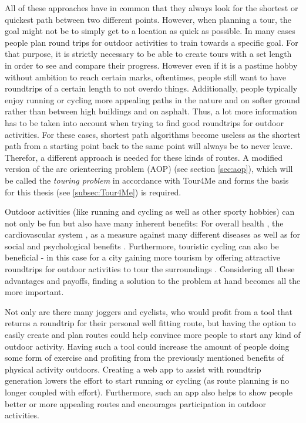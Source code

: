 All of these approaches have in common that they always look for the shortest or quickest path between two different points.
However, when planning a tour, the goal might not be to simply get to a location as quick as possible.
In many cases people plan round trips for outdoor activities  to train towards a specific goal.
For that purpose, it is strictly necessary to be able to create tours with a set length in order to see and compare their progress.
However even if it is a pastime hobby without ambition to reach certain marks, oftentimes, people still want to have roundtrips of a certain length to not overdo things.
Additionally, people typically enjoy running or cycling more appealing paths in the nature and on softer ground rather than between high buildings and on asphalt.
Thus, a lot more information has to be taken into account when trying to find good roundtrips for outdoor activities. 
For these cases, shortest path algorithms become useless as the shortest path from a starting point back to the same point will always be to never leave. 
Therefor, a different approach is needed for these kinds of routes.
A modified version of the arc orienteering problem (AOP) (see section \ref{sec:aop}), which will be called the \textit{touring problem} in accordance with Tour4Me \cite{buchin_tour4me_2022} and forms the basis for this thesis (see \ref{subsec:Tour4Me}) is required.


Outdoor activities (like running and cycling as well as other sporty hobbies) can not only be fun but also have many inherent benefits: 
For overall health \cite{oja_health_2011, ruegsegger_health_2018, vina_exercise_2012}, the cardiovascular system \cite{nystoriak_cardiovascular_2018}, as a measure against many different diseases \cite{oja_health_2011} as well as for social \cite{mueller_jogging_2007, obrien_jogging_2007, wankel_psychological_1990} and psychological benefits \cite{biddle_psychological_1993, cekin_psychological_2015, szabo_psychological_2013, wankel_psychological_1990}. 
Furthermore, touristic cycling can also be beneficial - in this case for a city gaining more tourism by offering attractive roundtrips for outdoor activities to tour the surroundings \cite{blondiau_economic_2016}.
Considering all these advantages and payoffs, finding a solution to the problem at hand becomes all the more important.

Not only are there many joggers and cyclists, who would profit from a tool that returns a roundtrip for their personal well fitting route, but having the option to easily create and plan routes could help convince more people to start any kind of outdoor activity.
Having such a tool could increase the amount of people doing some form of exercise and profiting from the previously mentioned benefits of physical activity outdoors. 
Creating a web app to assist with roundtrip generation lowers the effort to start running or cycling (as route planning is no longer coupled with effort).
Furthermore, such an app also helps to show people better or more appealing routes and encourages participation in outdoor activities.

